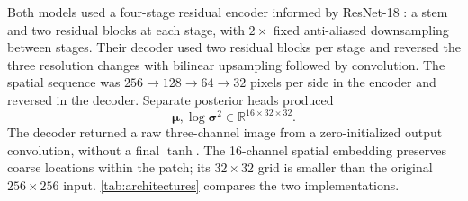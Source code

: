 \documentclass[conference,a4paper]{IEEEtran}
\begin{document}
Both models used a four-stage residual encoder informed by ResNet-18
\cite{he_deep_2016}: a stem and two residual blocks at each stage, with
$2\times$ fixed anti-aliased downsampling between stages. Their decoder used
two residual blocks per stage and reversed the three resolution changes with
bilinear upsampling followed by convolution. The spatial sequence was
$256\rightarrow128\rightarrow64\rightarrow32$ pixels per side in the
encoder and reversed in the decoder. Separate posterior heads produced
\begin{equation}
\boldsymbol{\mu},\log\boldsymbol{\sigma}^{2}
\in\mathbb{R}^{16\times32\times32}.
\end{equation}
The decoder returned a raw three-channel image from a zero-initialized
output convolution, without a final $\tanh$. The 16-channel spatial embedding
preserves coarse locations within the
patch; its $32\times32$ grid is smaller than the original $256\times256$
input. \autoref{tab:architectures} compares the two implementations.
\end{document}
